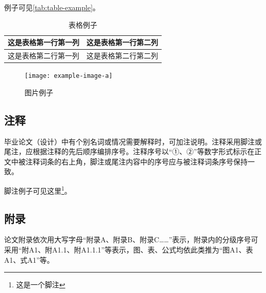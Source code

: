 例子可见\autoref{tab:table-example}。

\begin{table}[!htbp]
    \centering
    \caption{表格例子}
    \label{tab:table-example}
    \begin{tabular}{|l|l|}
        \hline
        \multicolumn{1}{|c|}{这是表格第一行第一列} & 这是表格第一行第二列 \\ \hline
        这是表格第二行第一列                       & 这是表格第二行第二列 \\ \hline
    \end{tabular}
\end{table}


\begin{figure}[!htbp]
    \centering
    \texttt{[image: example-image-a]}
    \caption{图片例子}
    \label{fig:example-figure}
\end{figure}

\subsection{注释}

毕业论文（设计）中有个别名词或情况需要解释时，可加注说明。注释采用脚注或尾注，应根据注释的先后顺序编排序号。注释序号以``①、②''等数字形式标示在正文中被注释词条的右上角，脚注或尾注内容中的序号应与被注释词条序号保持一致。

脚注例子可见这里\footnote{这是一个脚注}。


\subsection{附录}

论文附录依次用大写字母``附录A、附录B、附录C……''表示，附录内的分级序号可采用``附A1、附A1.1、附A1.1.1''等表示，图、表、公式均依此类推为``图A1、表A1、式A1''等。

